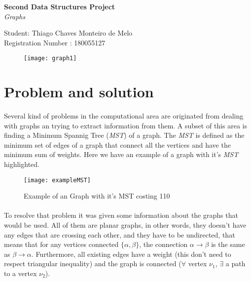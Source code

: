\documentclass[titlepage]{article}
\begin{document}
    \begin{titlepage}
        \begin{center}
            {\bfseries\huge Second Data Structures Project}\\[0.5cm]
            {\LARGE\emph{Graphs}}\\[2cm]
        \end{center}
        \begin{flushleft}
            Student: Thiago Chaves Monteiro de Melo\\
            Registration Number : 180055127\\[3cm]
        \end{flushleft}

        \begin{figure}[h]
            \texttt{[image: graph1]}
        \end{figure}
          
    \end{titlepage}
    \section{Problem and solution}
    \paragraph{}
        Several kind of problems in the computational area are originated from dealing with graphs an trying to extract information from them. A subset of this area is finding a Minimum Spannig Tree (\emph{MST}) of a graph. The \emph{MST} is defined as the minimum set of edges of a graph that connect all the vertices and have the minimum sum of weights. Here we have an example of a graph with it's \emph{MST} highlighted.
    \begin{figure}[h]
        \texttt{[image: exampleMST]}
        \caption{Example of an Graph with it's MST costing 110\label{fig:inp1}}
    \end{figure}
    \paragraph{}
        To resolve that problem it was given some information about the graphs that would be used. All of them are planar graphs, in other words, they doesn't have any edges that are crossing each other, and they have to be undirected, that means that for any vertices connected $\{\alpha , \beta\}$, the connection $\alpha \rightarrow \beta$ is the same as $\beta \rightarrow \alpha$. Furthermore, all existing edges have a weight (this don't need to respect triangular inequality) and the graph is connected ($\forall$ vertex $\nu_1$, $\exists$ a path to a vertex $\nu_2$).
\end{document}

